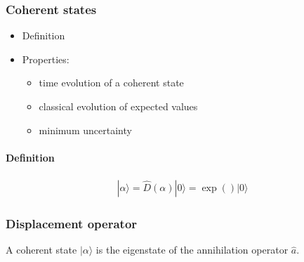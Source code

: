 \documentclass[letterpaper,10pt,english]{jupyterBook}
\begin{document}
\subsubsection{Coherent states}
\label{\detokenize{ch/quantum-mechanics/qft/harmonic-oscillator:coherent-states}}\label{\detokenize{ch/quantum-mechanics/qft/harmonic-oscillator:quantum-mechanics-qft-harmonic-oscillator-classical-limit-coherent-states}}\begin{itemize}
\item {} 
\sphinxAtStartPar
Definition

\item {} 
\sphinxAtStartPar
Properties:
\begin{itemize}
\item {} 
\sphinxAtStartPar
time evolution of a coherent state

\item {} 
\sphinxAtStartPar
classical evolution of expected values

\item {} 
\sphinxAtStartPar
minimum uncertainty

\end{itemize}

\end{itemize}


\paragraph{Definition}
\label{\detokenize{ch/quantum-mechanics/qft/harmonic-oscillator:definition}}
\sphinxAtStartPar
{}
\begin{equation*}
\begin{split}| \alpha \rangle = \hat{D}(\alpha) | 0 \rangle = \exp\left(  \right) | 0 \rangle\end{split}
\end{equation*}\subsubsection*{Displacement operator}

\sphinxAtStartPar
{} A coherent state \(| \alpha \rangle\) is the eigenstate of the annihilation operator \(\hat{a}\).
\end{document}

